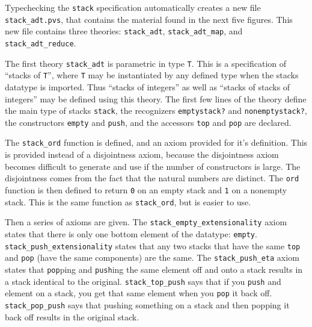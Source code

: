 Typechecking the \texttt{stack} specification automatically creates a new
file \texttt{stack\_adt.pvs}, that contains the material found in
the next five figures.  This new file contains three theories:
\texttt{stack\_adt}, \texttt{stack\_adt\_map}, and
\texttt{stack\_adt\_reduce}.


The first theory \texttt{stack\_adt} is parametric in type \texttt{T}.
This is a specification of ``stacks of \texttt{T}'', where \texttt{T} may
be instantiated by any defined type when the stacks datatype is imported.
Thus ``stacks of integers'' as well as ``stacks of stacks of integers''
may be defined using this theory.  The first few lines of the theory
define the main type of stacks \texttt{stack}, the recognizers
\texttt{emptystack?} and \texttt{nonemptystack?}, the constructors
\texttt{empty} and \texttt{push}, and the accessors \texttt{top} and
\texttt{pop} are declared.

The \texttt{stack\_ord} function is defined, and an axiom provided for
it's definition.  This is provided instead of a disjointness axiom,
because the disjointness axiom becomes difficult to generate and use if
the number of constructors is large.  The disjointness comes from the fact
that the natural numbers are distinct.  The \texttt{ord} function is then
defined to return \texttt{0} on an empty stack and \texttt{1} on a
nonempty stack.  This is the same function as \texttt{stack\_ord}, but is
easier to use.

Then a series of axioms are given.  The
\texttt{stack\_empty\_extensionality} axiom states that there is only one
bottom element of the datatype: \texttt{empty}.
\texttt{stack\_push\_extensionality} states that any two stacks that have
the same \texttt{top} and \texttt{pop} (have the same components) are the
same.  The \texttt{stack\_push\_eta} axiom states that \texttt{pop}ping
and \texttt{push}ing the same element off and onto a stack results in a
stack identical to the original.  \texttt{stack\_top\_push} says that if
you \texttt{push} and element on a stack, you get that same element when
you \texttt{pop} it back off.  \texttt{stack\_pop\_push} says that pushing
something on a stack and then popping it back off results in the original
stack.

